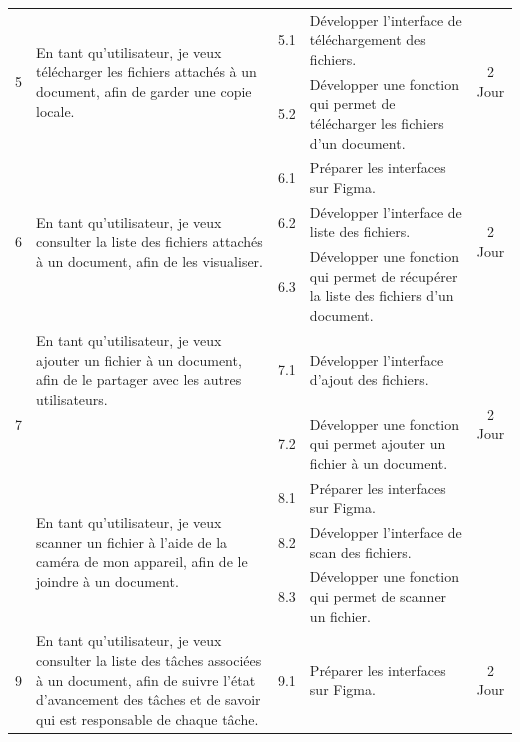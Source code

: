 \begin{adjustwidth}{-1cm}{}
\begin{longtable}{|c|p{6cm}|c|p{6cm}|c|}
      \cline{1-5}
      \multirow{2}{*}{5} & \multirow{2}{6cm}{En tant qu'utilisateur, je veux télécharger les fichiers attachés à un document, afin de garder une copie locale.} & 5.1 & Développer l'interface de téléchargement des fichiers. & \multirow{2}{*}{2 Jour} \\
      \cline{3-4}
      & & 5.2 & Développer une fonction qui permet de télécharger les fichiers d'un document. & \\
      \cline{1-5}
      \multirow{3}{*}{6} & \multirow{3}{6cm}{En tant qu'utilisateur, je veux consulter la liste des fichiers attachés à un document, afin de les visualiser.} & 6.1 & Préparer les interfaces sur Figma. & \multirow{3}{*}{2 Jour} \\
      \cline{3-4}
      & & 6.2 & Développer l'interface de liste des fichiers. & \\
      \cline{3-4}
      & & 6.3 & Développer une fonction qui permet de récupérer la liste des fichiers d'un document. & \\
      \cline{1-5}
      \multirow{3}{*}{7} & En tant qu'utilisateur, je veux ajouter un fichier à un document, afin de le partager avec les autres utilisateurs. & 7.1 & Développer l'interface d'ajout des fichiers. & \multirow{3}{*}{2 Jour} \\
      \cline{3-4}
      & & 7.2 & Développer une fonction qui permet ajouter un fichier à un document. & \\
      \cline{1-5}
      \multirow{3}{*}{8} & \multirow{3}{6cm}{En tant qu'utilisateur, je veux scanner un fichier à l'aide de la caméra de mon appareil, afin de le joindre à un document.} & 8.1 & Préparer les interfaces sur Figma. & \multirow{3}{*}{2 Jour} \\
      \cline{3-4}
      & & 8.2 & Développer l'interface de scan des fichiers. & \\
      \cline{3-4}
      & & 8.3 & Développer une fonction qui permet de scanner un fichier. & \\
      \cline{1-5}
      \multirow{3}{*}{9} & \multirow{3}{6cm}{En tant qu'utilisateur, je veux consulter la liste des tâches associées à un document, afin de suivre l'état d'avancement des tâches et de savoir qui est responsable de chaque tâche.} & 9.1 & Préparer les interfaces sur Figma. & \multirow{3}{*}{2 Jour} \\

\end{longtable}
\end{adjustwidth}
